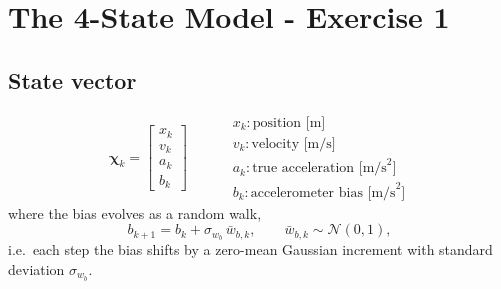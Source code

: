 \documentclass[12pt, a4paper]{article}
\begin{document}
\clearpage
\section*{The 4-State Model - Exercise 1}
\subsection*{State vector}
\[
\boldsymbol{\chi}_k = \begin{bmatrix} x_k \\ v_k \\ a_k \\ b_k \end{bmatrix}
\qquad
\begin{aligned}
  &x_k : \text{position [m]}\\
  &v_k : \text{velocity [m/s]}\\
  &a_k : \text{true acceleration [m/s}^2\text{]}\\
  &b_k : \text{accelerometer bias [m/s}^2\text{]}
\end{aligned}
\]
where the bias evolves as a random walk,
\[
  b_{k+1} = b_k + \sigma_{w_b}\,\bar{w}_{b,k}, \qquad \bar{w}_{b,k} \sim \mathcal{N}(0,1),
\]
i.e.\ each step the bias shifts by a zero-mean Gaussian increment with standard deviation $\sigma_{w_b}$.
\end{document}
